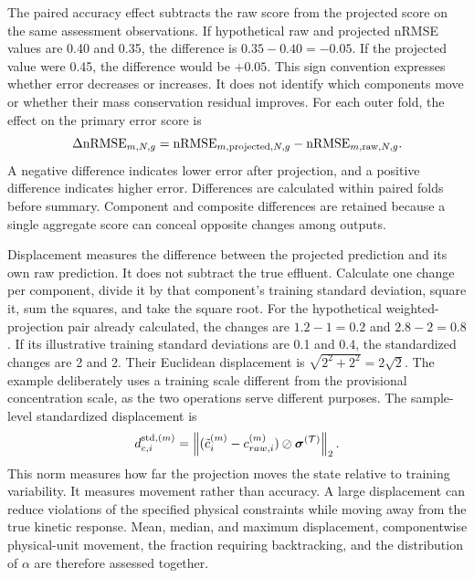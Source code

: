 The paired accuracy effect subtracts the raw score from the projected score on the same assessment observations. If hypothetical raw and projected nRMSE values are 0.40 and 0.35, the difference is $0.35-0.40=-0.05$. If the projected value were 0.45, the difference would be $+0.05$. This sign convention expresses whether error decreases or increases. It does not identify which components move or whether their mass conservation residual improves. For each outer fold, the effect on the primary error score is
\begin{equation}
\equationname{Paired difference in projected and raw prediction error}
\Delta\mathrm{nRMSE}_{m,N,g}=
\mathrm{nRMSE}_{m,\mathrm{projected},N,g}
-\mathrm{nRMSE}_{m,\mathrm{raw},N,g}.
\label{eq:projection_paired_error_difference}
\end{equation}
A negative difference indicates lower error after projection, and a positive difference indicates higher error. Differences are calculated within paired folds before summary. Component and composite differences are retained because a single aggregate score can conceal opposite changes among outputs.

Displacement measures the difference between the projected prediction and its own raw prediction. It does not subtract the true effluent. Calculate one change per component, divide it by that component's training standard deviation, square it, sum the squares, and take the square root. For the hypothetical weighted-projection pair already calculated, the changes are $1.2-1=0.2$ and $2.8-2=0.8$. If its illustrative training standard deviations are 0.1 and 0.4, the standardized changes are 2 and 2. Their Euclidean displacement is $\sqrt{2^2+2^2}=2\sqrt2$. The example deliberately uses a training scale different from the provisional concentration scale, as the two operations serve different purposes. The sample-level standardized displacement is
\begin{equation}
\equationname{Standardized component displacement caused by projection}
d_{c,i}^{\mathrm{std},(m)}=
\left\|(\tilde c_i^{(m)}-c_{raw,i}^{(m)})
\oslash\boldsymbol{\sigma}^{(\mathcal{T})}\right\|_2.
\label{eq:projection_standardized_displacement}
\end{equation}
This norm measures how far the projection moves the state relative to training variability. It measures movement rather than accuracy. A large displacement can reduce violations of the specified physical constraints while moving away from the true kinetic response. Mean, median, and maximum displacement, componentwise physical-unit movement, the fraction requiring backtracking, and the distribution of $\alpha$ are therefore assessed together.

